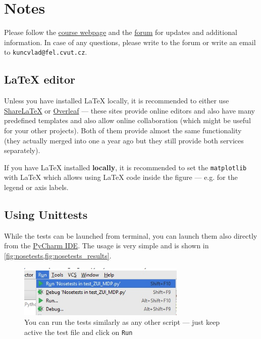 \documentclass[10pt,journal,compsoc,twoside]{IEEEtran}
\begin{document}
\appendices
\section{Notes}
Please follow the \href{http://cw.fel.cvut.cz/wiki/courses/b4b36zui/tasks/task4-gridworld-en}{course webpage} and the \href{https://cw.felk.cvut.cz/forum/forum-1494-page-1.html}{forum} for updates and additional information. In case of any questions, please write to the forum or write an email to \texttt{kuncvlad@fel.cvut.cz}.
\subsection{\LaTeX{} editor}
Unless you have installed \LaTeX{} locally, it is recommended to either use \href{https://www.sharelatex.com?r=8e97ffd0&rm=d&rs=b}{ShareLaTeX} or \href{https://www.overleaf.com/signup?ref=54db136ac70d}{Overleaf} --- these sites provide online editors and also have many predefined templates and also allow online collaboration (which might be useful for your other projects). Both of them provide almost the same functionality (they actually merged into one a year ago but they still provide both services separately).

If you have \LaTeX{} installed \textbf{locally}, it is recommended to set the \texttt{matplotlib} with \LaTeX{} which allows using \LaTeX{} code inside the figure --- e.g. for the legend or axis labels.

\subsection{Using Unittests}
While the tests can be launched from terminal, you can launch them also directly from the \href{https://www.jetbrains.com/pycharm/}{PyCharm IDE}. The usage is very simple and is shown in \cref{fig:nosetests,fig:nosetests_results}.

\begin{figure}[t]
    \includegraphics[width=8cm]{figures/pycharm_nosetests.jpg}
    \centering
    \caption{You can run the tests similarly as any other script --- just keep active the test file and click on \texttt{Run}}
    \label{fig:nosetests}
\end{figure}
\end{document}
